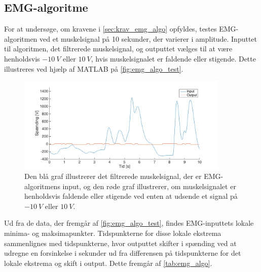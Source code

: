 \subsection{EMG-algoritme}
For at undersøge, om kravene i \autoref{sec:krav_emg_algo} opfyldes, testes EMG-algoritmen ved et muskelsignal på 10 sekunder, der varierer i amplitude. Inputtet til algoritmen, det filtrerede muskelsignal, og outputtet vælges til at være henholdsvis $-10~V$ eller $10~V$, hvis muskelsignalet er faldende eller stigende. Dette illustreres ved hjælp af MATLAB på \autoref{fig:emg_algo_test}. 

\begin{figure}[H]
\centering
\includegraphics[width=0.9\textwidth]{figures/EMG_algo_test}
\caption{Den blå graf illustrerer det filtrerede muskelsignal, der er EMG-algoritmens input, og den røde graf illustrerer, om muskelsignalet er henholdsvis faldende eller stigende ved enten at udsende et signal på $-10~V$ eller $10~V$.}
\label{fig:emg_algo_test}
\end{figure}

\noindent
Ud fra de data, der fremgår af \autoref{fig:emg_algo_test}, findes EMG-inputtets lokale minima- og maksimapunkter. Tidspunkterne for disse lokale ekstrema sammenlignes med tidspunkterne, hvor outputtet skifter i spænding ved at udregne en forsinkelse i sekunder ud fra differensen på tidspunkterne for det lokale ekstrema og skift i output. Dette fremgår af \autoref{tab:emg_algo}. 

